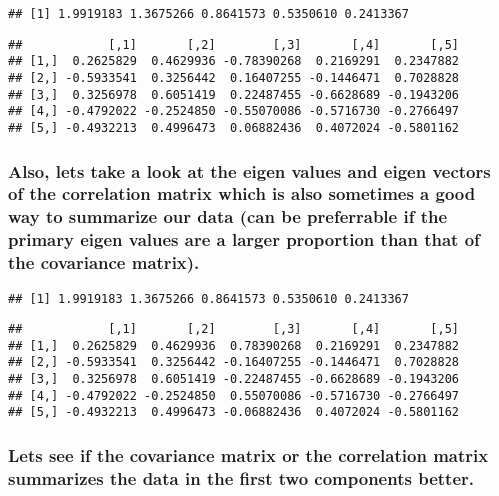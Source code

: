 \documentclass[]{article}
\begin{document}
\begin{verbatim}
## [1] 1.9919183 1.3675266 0.8641573 0.5350610 0.2413367
\end{verbatim}

\begin{verbatim}
##            [,1]       [,2]        [,3]       [,4]       [,5]
## [1,]  0.2625829  0.4629936 -0.78390268  0.2169291  0.2347882
## [2,] -0.5933541  0.3256442  0.16407255 -0.1446471  0.7028828
## [3,]  0.3256978  0.6051419  0.22487455 -0.6628689 -0.1943206
## [4,] -0.4792022 -0.2524850 -0.55070086 -0.5716730 -0.2766497
## [5,] -0.4932213  0.4996473  0.06882436  0.4072024 -0.5801162
\end{verbatim}

\hypertarget{also-lets-take-a-look-at-the-eigen-values-and-eigen-vectors-of-the-correlation-matrix-which-is-also-sometimes-a-good-way-to-summarize-our-data-can-be-preferrable-if-the-primary-eigen-values-are-a-larger-proportion-than-that-of-the-covariance-matrix.-1}{%
\subsubsection{Also, lets take a look at the eigen values and eigen
vectors of the correlation matrix which is also sometimes a good way to
summarize our data (can be preferrable if the primary eigen values are a
larger proportion than that of the covariance
matrix).}\label{also-lets-take-a-look-at-the-eigen-values-and-eigen-vectors-of-the-correlation-matrix-which-is-also-sometimes-a-good-way-to-summarize-our-data-can-be-preferrable-if-the-primary-eigen-values-are-a-larger-proportion-than-that-of-the-covariance-matrix.-1}}

\begin{verbatim}
## [1] 1.9919183 1.3675266 0.8641573 0.5350610 0.2413367
\end{verbatim}

\begin{verbatim}
##            [,1]       [,2]        [,3]       [,4]       [,5]
## [1,]  0.2625829  0.4629936  0.78390268  0.2169291  0.2347882
## [2,] -0.5933541  0.3256442 -0.16407255 -0.1446471  0.7028828
## [3,]  0.3256978  0.6051419 -0.22487455 -0.6628689 -0.1943206
## [4,] -0.4792022 -0.2524850  0.55070086 -0.5716730 -0.2766497
## [5,] -0.4932213  0.4996473 -0.06882436  0.4072024 -0.5801162
\end{verbatim}

\hypertarget{lets-see-if-the-covariance-matrix-or-the-correlation-matrix-summarizes-the-data-in-the-first-two-components-better.-1}{%
\subsubsection{Lets see if the covariance matrix or the correlation
matrix summarizes the data in the first two components
better.}\label{lets-see-if-the-covariance-matrix-or-the-correlation-matrix-summarizes-the-data-in-the-first-two-components-better.-1}}
\end{document}
